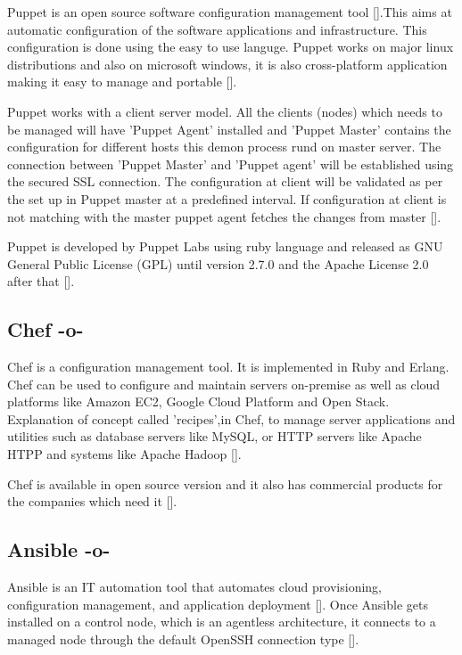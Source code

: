Puppet is an open source software configuration management
tool [\cite{www-puppet-wiki-puppet}].This aims at automatic
configuration of the software applications and infrastructure. This
configuration is done using the easy to use languge.  Puppet works on
major linux distributions and also on microsoft windows, it is also
cross-platform application making it easy to manage and
portable [\cite{www-puppet-puppet-site}].

Puppet works with a client server model. All the clients (nodes)
which needs to be managed will have 'Puppet Agent' installed and
'Puppet Master' contains the configuration for different hosts this
demon process rund on master server. The connection between 'Puppet
Master' and 'Puppet agent' will be established using the secured SSL
connection. The configuration at client will be validated as per the
set up in Puppet master at a predefined interval. If configuration at
client is not matching with the master puppet agent fetches the
changes from master [\cite{www-puppet-slashroot}].

Puppet is developed by Puppet Labs using ruby language and released as
GNU General Public License (GPL) until version 2.7.0 and the Apache
License 2.0 after that [\cite{www-puppet-wiki-puppet}].


  
\subsection{Chef -o-}

Chef is a configuration management tool. It is implemented in Ruby and
Erlang. Chef can be used to configure and maintain servers on-premise
as well as cloud platforms like Amazon EC2, Google Cloud Platform and
Open Stack. Explanation of concept called 'recipes',in Chef, to
manage server applications and utilities such as database servers like
MySQL, or HTTP servers like Apache HTPP and systems like Apache
Hadoop [\cite{chef-book}].

Chef is available in open source version and it also has commercial
products for the companies which need it [\cite{www-chef-commercial}].



\subsection{Ansible -o-}

Ansible is an IT automation tool that automates cloud provisioning,
configuration management, and application
deployment [\cite{www-ansible}]. Once Ansible gets installed on a
control node, which is an agentless architecture, it connects to a
managed node through the default OpenSSH connection
type [\cite{www-ansible-wikipedia}].

